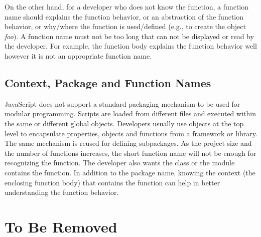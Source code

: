 \documentclass[10pt, preprint]{sigplanconf}
\begin{document}
 On the other hand, for a developer who does not know the function, a function name should explains the function behavior, or an abstraction of the function behavior, or why/where the function is used/defined (e.g., to create the object \textit{foo}). A function name must not be too long that can not be displayed or read by the developer. For example, the function body explains the function behavior well however it is not an appropriate function name.

\subsection{Context, Package and Function Names}
JavaScript does not support a standard packaging mechanism to be used for modular programming. Scripts are loaded from different files and executed within the same or different global objects. Developers usually use objects at the top level to encapsulate properties, objects and functions from a framework or library. The same mechanism is reused for defining subpackages. As the project size and the number of functions increases, the short function name will not be enough for recognizing the function. The developer also wants the class or the module contains the function. In addition to the package name, knowing the context (the enclosing function body) that contains the function can help in better understanding the function behavior.


\section{To Be Removed}
\end{document}
